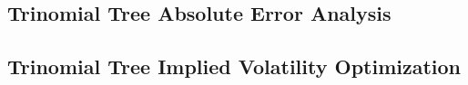 \documentclass[10pt]{article}
\begin{document}
            
        
        \subsection{Trinomial Tree Absolute Error Analysis} \label{appendix:source:q2:abs_error}

            
        
        \subsection{Trinomial Tree Implied Volatility Optimization} \label{appendix:source:q2:imp_vol}

            

    
\end{document}
